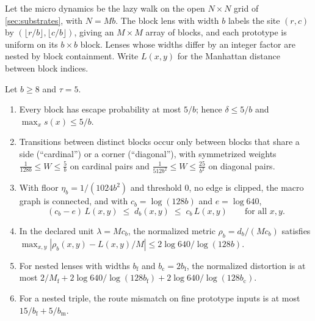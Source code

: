Let the micro dynamics be the lazy walk on the open $N\times N$ grid of \cref{sec:substrates}, with $N=Mb$.
The block lens with width $b$ labels the site $(r,c)$ by $(\lfloor r/b\rfloor,\lfloor c/b\rfloor)$, giving an $M\times M$ array of blocks, and each prototype is uniform on its $b\times b$ block.
Lenses whose widths differ by an integer factor are nested by block containment.
Write $L(x,y)$ for the Manhattan distance between block indices.

\begin{theorem}
\label{thm:grid}
Let $b\ge8$ and $\tau=5$.
\begin{enumerate}[label=(\roman*)]
\item Every block has escape probability at most $5/b$; hence $\delta\le5/b$ and $\max_x s(x)\le5/b$.
\item Transitions between distinct blocks occur only between blocks that share a side (``cardinal'') or a corner (``diagonal''), with symmetrized weights
$\frac{1}{128b}\le W\le\frac5b$ on cardinal pairs and $\frac{1}{512b^2}\le W\le\frac{25}{b^2}$ on diagonal pairs.
\item With floor $\eta_b=1/(1024b^2)$ and threshold $0$, no edge is clipped, the macro graph is connected, and with $c_b=\log(128b)$ and $e=\log 640$,
\begin{equation}
(c_b-e)\,L(x,y)\;\le\;d_b(x,y)\;\le\;c_b\,L(x,y)\qquad\text{for all }x,y.
\end{equation}
\item In the declared unit $\lambda=Mc_b$, the normalized metric $\rho_b=d_b/(Mc_b)$ satisfies
$\max_{x,y}|\rho_b(x,y)-L(x,y)/M|\le 2\log640/\log(128b)$.
\item For nested lenses with widths $b_{\mathrm f}$ and $b_{\mathrm c}=2b_{\mathrm f}$, the normalized distortion is at most $2/M_{\mathrm f}+2\log640/\log(128b_{\mathrm f})+2\log640/\log(128b_{\mathrm c})$.
\item For a nested triple, the route mismatch on fine prototype inputs is at most $15/b_{\mathrm f}+5/b_{\mathrm m}$.
\end{enumerate}
\end{theorem}


